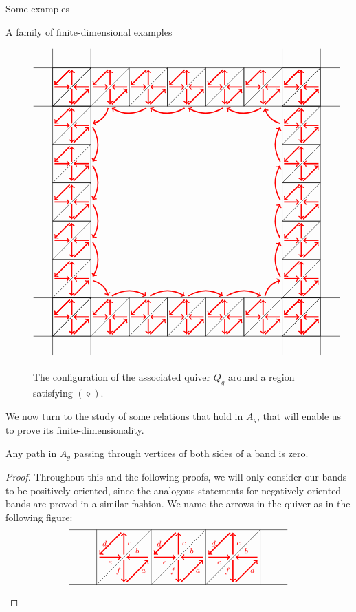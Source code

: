\begin{chapter}{Some examples}
\begin{section}{A family of finite-dimensional examples}
\begin{figure}[h]
\[
\begin{tikzpicture}[scale=0.7]
\foreach \x in {-6,-4,...,6}
{
\ArrowedSquare{\x}{6}
\ArrowedSquare{\x}{-6}
\ArrowedSquare{6}{\x}
\ArrowedSquare{-6}{\x}
}
\draw (-8,-7) to (-7,-7);
\draw (-8,-5) to (-7,-5);
\draw (8,-7) to (7,-7);
\draw (8,-5) to (7,-5);
\draw (-8,7) to (-7,7);
\draw (-8,5) to (-7,5);
\draw (8,7) to (7,7);
\draw (8,5) to (7,5);
\draw (-7,-8) to (-7,-7);
\draw (-5,-8) to (-5,-7);
\draw (-7,8) to (-7,7);
\draw (-5,8) to (-5,7);
\draw (7,-8) to (7,-7);
\draw (5,-8) to (5,-7);
\draw (7,8) to (7,7);
\draw (5,8) to (5,7);
\foreach \x in {-4,-2,...,2}
{
\draw[<-, red, very thick] (-6+1.1, \x + 0.1) to [bend right] (-6+1.1, \x + 1.9);
\draw[->, red, very thick] (6-1.1, \x + 0.1) to [bend left] (6-1.1, \x + 1.9);
\draw[->, red, very thick] (\x + 0.1,-6+1.1) to [bend left] (\x + 1.9,-6+1.1);
\draw[<-, red, very thick] (\x + 0.1, 6-1.1) to [bend right] (\x + 1.9, 6-1.1);
}
\draw[->, red, very thick] (-4-0.1, 6-1.1) to [bend left] (-6+1.1, 4+0.1);
\draw[<-, red, very thick] (4+0.1, 6-1.1) to [bend right] (6-1.1, 4+0.1);
\draw[<-, red, very thick] (6-1.1, -4-0.1) to [bend right] (4+0.1, -6+1.1);
\draw[->, red, very thick] (-6+1.1, -4-0.1) to [bend left] (-4-0.1,-6+1.1);
\end{tikzpicture}
\]
\caption{The configuration of the associated quiver $Q_g$ around a region satisfying \hyperref[diamondhyp]{$(\diamond)$}.}
\end{figure}
We now turn to the study of some relations that hold in $A_g$, that will enable us to prove its finite-dimensionality.

\begin{lemma}\label{band-sides} Any path in $A_g$ passing through vertices of both sides of a band is zero.
\end{lemma}
\begin{proof} Throughout this and the following proofs, we will only consider our bands to be positively oriented, since the analogous statements for negatively oriented bands are proved in a similar fashion. We name the arrows in the quiver as in the following figure:
\[
\begin{tikzpicture}[text width=1.5mm, font=\footnotesize]
\draw (-4, 0) -- (4, 0);
\draw (-4, 2) -- (4, 2);
\foreach \x in {-3,-1,...,3}
\draw (\x, 0) -- (\x, 2);
\foreach \x in {-3,-1,1}
{
\draw (\x,0) -- (\x+2, 2);
\draw [->, red, very thick] (\x+1.9, 1) to node[above] {$b$} (\x+1.1, 1);
\draw[->, red, very thick] (\x+1, 0.9) to node[left]{$f$} (\x+1, 0.1);
\draw[->, red, very thick] (\x+1.1, 0.1) to node[right]{$a$} (\x+1.9, 0.9);
\draw[->, red, very thick] (\x+1, 1.1) to node[right]{$c$} (\x+1, 1.9);
\draw[->, red, very thick] (\x+0.9, 1.9) to node[left]{$d$} (\x+0.1, 1.1);
\draw[->, red, very thick] (\x+0.1, 1) to node[below]{$e$} (\x+0.9, 1);
}


\end{tikzpicture}\]
\end{proof}
\end{section}
\end{chapter}
